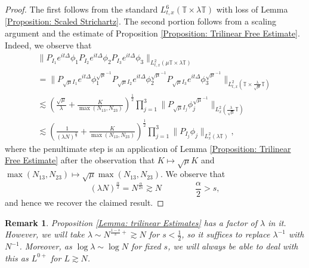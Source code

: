 \documentclass[12pt, letterpaper]{amsart}
\newtheorem{remark}{Remark}
\begin{document}
\begin{proof}
    The first follows from the standard $L^6_{t,x}(\mathbb{T}\times\lambda\mathbb{T})$ with loss of Lemma \ref{Proposition: Scaled Strichartz}. 
    The second portion follows from a scaling argument and the estimate of Proposition \ref{Proposition: Trilinear Free Estimate}. Indeed, we observe that
    \begin{multline*} \|P_{I_1}e^{it\Delta}\phi_1P_{I_2}e^{it\Delta}\phi_2P_{I_3}e^{it\Delta}\phi_3\|_{L^2_{t,x}(\mu\mathbb{T}\times\lambda\mathbb{T})}\\
    = \|P_{\sqrt{\mu}I_1}e^{it\Delta}\phi_1^{\sqrt{\mu}^{-1}}P_{\sqrt{\mu}I_2}e^{it\Delta}\phi_2^{\sqrt{\mu}^{-1}}P_{\sqrt{\mu}I_3}e^{it\Delta}\phi_3^{\sqrt{\mu}^{-1}}\|_{L^2_{t,x}(\mathbb{T}\times\tfrac{\lambda}{\sqrt{\mu}}\mathbb{T})}\\
    \lesssim \left(\frac{\sqrt{\mu}}{\lambda} + \frac{K}{\max(N_{13}, N_{23})}\right)^\frac12\prod_{j=1}^3\|P_{\sqrt{\mu}I_j}\phi_j^{\sqrt{\mu}^{-1}}\|_{L^2_x(\tfrac{\lambda}{\sqrt{\mu}}\mathbb{T})}\\
    \lesssim \left(\frac{1}{(\lambda N)^\frac{\alpha}{2}}+\frac{K}{\max(N_{13}, N_{23})}\right)^\frac{1}{2}\prod_{j=1}^3\|P_{I_j}\phi_j\|_{L^2_x(\lambda\mathbb{T})},
    \end{multline*}
    where the penultimate step is an application of Lemma \ref{Proposition: Trilinear Free Estimate} after the observation that $K\mapsto \sqrt{\mu}K$ and $\max(N_{13}, N_{23})\mapsto \sqrt{\mu}\max(N_{13}, N_{23})$. We observe that
    \[
    (\lambda N)^\frac{\alpha}{2} = N^\frac{\alpha}{2s}\gtrsim N\qquad\qquad\frac{\alpha}{2} > s,
    \]
    and hence we recover the claimed result.
\end{proof}
\begin{remark}
    Proposition \ref{Lemma: trilinear Estimates} has a factor of $\lambda$ in it. However, we will take $\lambda \sim N^{\frac{1-s}{s}+}\gtrsim N$ for $s < \frac12$, so it suffices to replace $\lambda^{-1}$ with $N^{-1}$. Moreover, as $\log\lambda\sim \log N$ for fixed $s$, we will always be able to deal with this as $L^{0+}$ for $L\gtrsim N$.
\end{remark}
\end{document}
